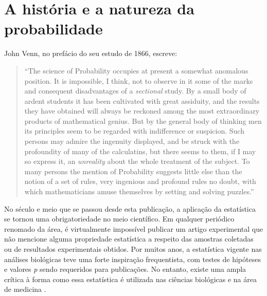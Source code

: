 \section{A história e a natureza da probabilidade}

John Venn, no prefácio do seu estudo de 1866, escreve:

\begin{quote}
``The science of Probability occupies at present a somewhat anomalous position. It is impossible, I think, not to observe
in it some of the marks and consequent disadvantages of a {\em sectional} study. By a small body of ardent students it
has been cultivated with great assiduity, and the results they have obtained will always be reckoned among the most 
extraordinary products of mathematical genius. But by the general body of thinking men its principles seem to be regarded
with indifference or suspicion. Such persons may admire the ingenuity displayed, and be struck with the profoundity
of many of the calculatins, but there seems to them, if I may so express it, an {\em unreality} about the whole treatment
of the subject. To many persons the mention of Probability suggests little else than the notion of a set of rules, very
ingenious and profound rules no doubt, with which mathematicians amuse themselves by setting and solving puzzles.''
\citep{Venn1866}
\end{quote}

No século e meio que se passou desde esta publicação, a aplicação da estatística se tornou uma obrigatoriedade no meio científico.
Em qualquer periódico renomado da área, é virtualmente impossível publicar um artigo experimental que não 
mencione alguma propriedade
estatística a respeito das amostras coletadas ou de resultados experimentais obtidos. 
Por muitos anos, a estatística vigente nas análises biológicas teve uma
forte inspiração frequentista, com testes de hipóteses e valores {\em p} sendo requeridos para publicações. 
No entanto, existe uma ampla crítica à forma como essa estatística é
utilizada nas ciências biológicas e na área de medicina \citep{Ioannidis05}.

